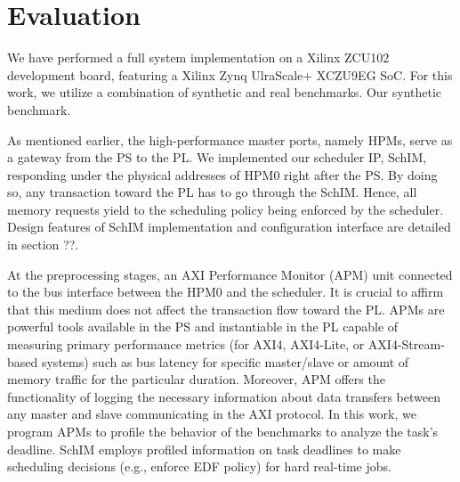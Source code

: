 \section{Evaluation}

We have performed a full system implementation on a Xilinx ZCU102 development board, featuring a Xilinx Zynq UlraScale+ XCZU9EG SoC. For this work, we utilize a combination of synthetic and real benchmarks. Our synthetic benchmark.

As mentioned earlier, the high-performance master ports, namely HPMs, serve as a gateway from the PS to the PL. We implemented our scheduler IP, SchIM, responding under the physical addresses of HPM0 right after the PS. By doing so, any transaction toward the PL has to go through the SchIM. Hence, all memory requests yield to the scheduling policy being enforced by the scheduler. Design features of SchIM implementation and configuration interface are detailed in section ??.


At the preprocessing stages, an AXI Performance Monitor (APM) unit connected to the bus interface between the HPM0 and the scheduler. It is crucial to affirm that this medium does not affect the transaction flow toward the PL.  APMs are powerful tools available in the PS and instantiable in the PL capable of measuring primary performance metrics (for AXI4, AXI4-Lite, or AXI4-Stream-based systems) such as bus latency for specific master/slave or amount of memory traffic for the particular duration. Moreover, APM offers the functionality of logging the necessary information about data transfers between any master and slave communicating in the AXI protocol. In this work, we program APMs to profile the behavior of the benchmarks to analyze the task's deadline. SchIM employs profiled information on task deadlines to make scheduling decisions (e.g., enforce EDF policy) for hard real-time jobs.

